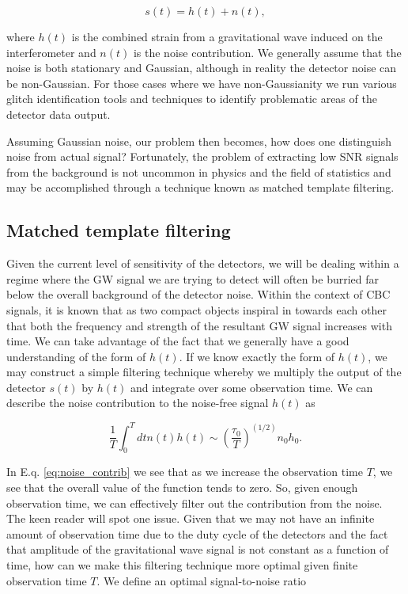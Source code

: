 \begin{equation}
    s(t) = h(t) + n(t),
\end{equation}{}

where $h(t)$ is the combined strain from a gravitational wave induced on the interferometer and $n(t)$ is the noise contribution. We generally assume that the noise is both stationary and Gaussian, although in reality the detector noise can be non-Gaussian. For those cases where we have non-Gaussianity we run various glitch identification tools and techniques to identify problematic areas of the detector data output. 

Assuming Gaussian noise, our problem then becomes, how does one distinguish noise from actual signal? Fortunately, the problem of extracting low \ac{SNR} signals from the background is not uncommon in physics and the field of statistics and may be accomplished through a technique known as matched template filtering.

\subsection{Matched template filtering}

Given the current level of sensitivity of the detectors, we will be dealing within a regime where the \ac{GW} signal we are trying to detect will often be burried far below the overall background of the detector noise. Within the context of \ac{CBC} signals, it is known that as two compact objects inspiral in towards each other that both the frequency and strength of the resultant \ac{GW} signal increases with time. We can take advantage of the fact that we generally have a good understanding of the form of $h(t)$. If we know exactly the form of $h(t)$, we may construct a simple filtering technique whereby we multiply the output of the detector $s(t)$ by $h(t)$ and integrate over some observation time. We can describe the noise contribution to the noise-free signal $h(t)$ as 

\begin{equation} \label{eq:noise_contrib}
    \frac{1}{T} \int_0^T dt n(t) h(t) \sim (\frac{\tau_{0}}{T})^{(1/2)} n_{0} h_{0}.
\end{equation}{}

In E.q. \ref{eq:noise_contrib} we see that as we increase the observation time $T$, we see that the overall value of the function tends to zero. So, given enough observation time, we can effectively filter out the contribution from the noise. The keen reader will spot one issue. Given that we may not have an infinite amount of observation time due to the duty cycle of the detectors and the fact that amplitude of the gravitational wave signal is not constant as a function of time, how can we make this filtering technique more optimal given finite observation time $T$. We define an optimal signal-to-noise ratio

